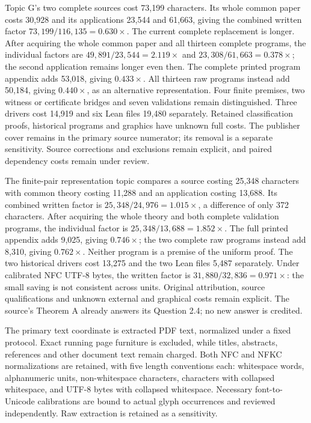 \documentclass[11pt,a4paper]{article}
\begin{document}
Topic G's two complete sources cost 73,199 characters. Its whole common
paper costs 30,928 and its applications 23,544 and 61,663, giving the
combined written factor $73{,}199/116{,}135=0.630\times$. The current
complete replacement is longer. After acquiring the whole common paper
and all thirteen complete programs, the individual factors are
$49{,}891/23{,}544=2.119\times$ and $23{,}308/61{,}663=0.378\times$;
the second application remains longer even then. The complete printed
program appendix adds 53,018, giving $0.433\times$. All thirteen raw
programs instead add 50,184, giving $0.440\times$, as an alternative
representation. Four finite premises, two witness or certificate bridges
and seven validations remain distinguished. Three drivers cost 14,919
and six Lean files 19,480 separately. Retained classification proofs,
historical programs and graphics have unknown full costs. The publisher
cover remains in the primary source numerator; its removal is a separate
sensitivity. Source corrections and exclusions remain explicit, and
paired dependency costs remain under review.

The finite-pair representation topic compares a source costing 25,348
characters with common theory costing 11,288 and an application costing
13,688. Its combined written factor is $25{,}348/24{,}976=1.015\times$,
a difference of only 372 characters. After acquiring the whole theory and
both complete validation programs, the individual factor is
$25{,}348/13{,}688=1.852\times$. The full printed appendix adds 9,025,
giving $0.746\times$; the two complete raw programs instead add 8,310,
giving $0.762\times$. Neither program is a premise of the uniform proof.
The two historical drivers cost 13,275 and the two Lean files 5,487
separately. Under calibrated NFC UTF-8 bytes, the written factor is
$31{,}880/32{,}836=0.971\times$: the small saving is not consistent across
units. Original attribution, source qualifications and unknown external
and graphical costs remain explicit. The source's Theorem A already
answers its Question 2.4; no new answer is credited.

The primary text coordinate is extracted PDF text, normalized under a fixed
protocol. Exact running page furniture is excluded, while titles, abstracts,
references and other document text remain charged. Both NFC and NFKC
normalizations are retained, with five length conventions each: whitespace
words, alphanumeric units, non-whitespace characters, characters with
collapsed whitespace, and UTF-8 bytes with collapsed whitespace. Necessary
font-to-Unicode calibrations are bound to actual glyph occurrences and
reviewed independently. Raw extraction is retained as a sensitivity.
\end{document}
